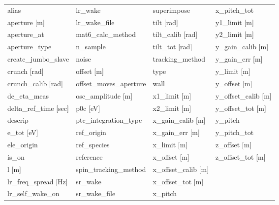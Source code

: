  \begin{tabular}{llll} \toprule
alias                            & lr_wake                          & superimpose                      & x_pitch_tot                      \\
aperture [m]                     & lr_wake_file                     & tilt [rad]                       & y1_limit [m]                     \\
aperture_at                      & mat6_calc_method                 & tilt_calib [rad]                 & y2_limit [m]                     \\
aperture_type                    & n_sample                         & tilt_tot [rad]                   & y_gain_calib [m]                 \\
create_jumbo_slave               & noise                            & tracking_method                  & y_gain_err [m]                   \\
crunch [rad]                     & offset [m]                       & type                             & y_limit [m]                      \\
crunch_calib [rad]               & offset_moves_aperture            & wall                             & y_offset [m]                     \\
de_eta_meas                      & osc_amplitude [m]                & x1_limit [m]                     & y_offset_calib [m]               \\
delta_ref_time [sec]             & p0c [eV]                         & x2_limit [m]                     & y_offset_tot [m]                 \\
descrip                          & ptc_integration_type             & x_gain_calib [m]                 & y_pitch                          \\
e_tot [eV]                       & ref_origin                       & x_gain_err [m]                   & y_pitch_tot                      \\
ele_origin                       & ref_species                      & x_limit [m]                      & z_offset [m]                     \\
is_on                            & reference                        & x_offset [m]                     & z_offset_tot [m]                 \\
l [m]                            & spin_tracking_method             & x_offset_calib [m]               &                                  \\
lr_freq_spread [Hz]              & sr_wake                          & x_offset_tot [m]                 &                                  \\
lr_self_wake_on                  & sr_wake_file                     & x_pitch                          &                                  \\
 \bottomrule
 \end{tabular}
 \vfill
 
